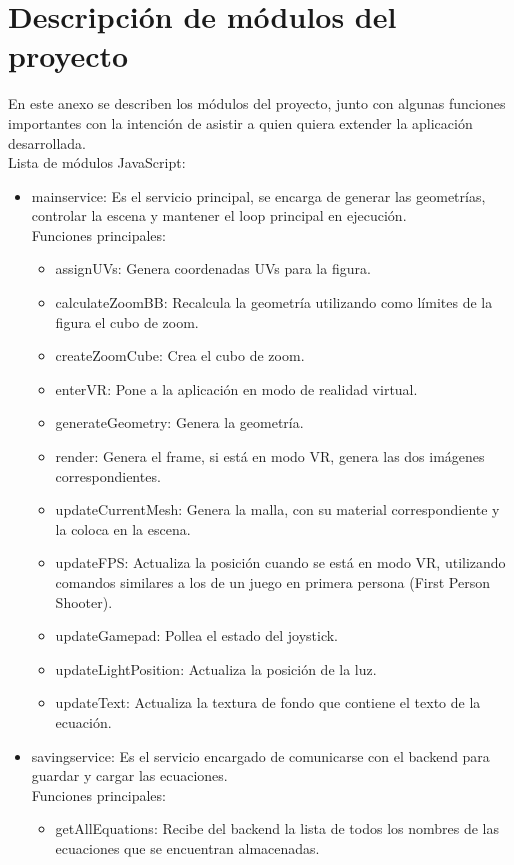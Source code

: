 \documentclass[12pt]{article}
\begin{document}
\section{Descripción de módulos del proyecto}
En este anexo se describen los módulos del proyecto, junto con algunas funciones importantes con la intención de asistir a quien quiera extender la aplicación desarrollada.
\\Lista de módulos JavaScript:
\begin{itemize}
\item mainservice: Es el servicio principal, se encarga de generar las geometrías, controlar la escena y mantener el loop principal en ejecución.
	\\Funciones principales:
	\begin{itemize}
	\item assignUVs: Genera coordenadas UVs para la figura.
	\item calculateZoomBB: Recalcula la geometría utilizando como límites de la figura el cubo de zoom.
	\item createZoomCube: Crea el cubo de zoom.
	\item enterVR: Pone a la aplicación en modo de realidad virtual.
	\item generateGeometry: Genera la geometría.
	\item render: Genera el frame, si está en modo VR, genera las dos imágenes correspondientes.
	\item updateCurrentMesh: Genera la malla, con su material correspondiente y la coloca en la escena.
	\item updateFPS: Actualiza la posición cuando se está en modo VR, utilizando comandos similares a los de un juego en primera persona (First Person Shooter).
	\item updateGamepad: Pollea el estado del joystick.
	\item updateLightPosition: Actualiza la posición de la luz.
	\item updateText: Actualiza la textura de fondo que contiene el texto de la ecuación.
	\end{itemize}
\item savingservice: Es el servicio encargado de comunicarse con el backend para guardar y cargar las ecuaciones.
	\\Funciones principales:
	\begin{itemize}
	\item getAllEquations: Recibe del backend la lista de todos los nombres de las ecuaciones que se encuentran almacenadas.

\end{itemize}
\end{itemize}
\end{document}
